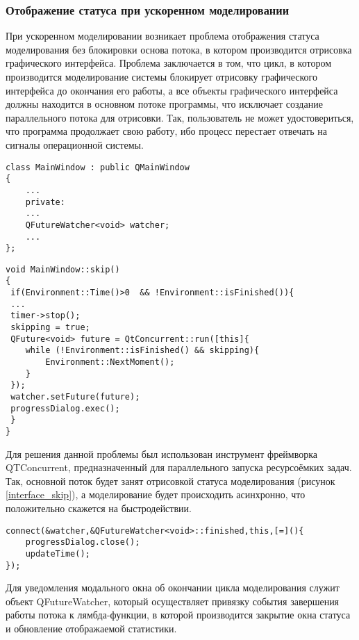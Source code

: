 \subsubsection{Отображение статуса при ускоренном моделировании}
При ускоренном моделировании возникает проблема отображения статуса моделирования без блокировки основа потока, в котором производится отрисовка графического интерфейса. Проблема заключается в том, что цикл, в котором производится моделирование системы блокирует отрисовку графического интерфейса до окончания его работы, а все объекты графического интерфейса должны находится в основном потоке программы, что исключает создание параллельного потока для отрисовки. Так, пользователь не может удостовериться, что программа продолжает свою работу, ибо процесс перестает отвечать на сигналы операционной системы.
\begin{lstlisting}
class MainWindow : public QMainWindow
{
	...
	private:
	...
	QFutureWatcher<void> watcher;
	...
};
\end{lstlisting}
\begin{lstlisting}
void MainWindow::skip()
{
 if(Environment::Time()>0  && !Environment::isFinished()){
 ...
 timer->stop();
 skipping = true;
 QFuture<void> future = QtConcurrent::run([this]{
	while (!Environment::isFinished() && skipping){
		Environment::NextMoment();
	}
 });
 watcher.setFuture(future);
 progressDialog.exec();
 }
}
\end{lstlisting}

Для решения данной проблемы был использован инструмент фреймворка QTConcurrent, предназначенный для параллельного запуска ресурсоёмких задач. Так, основной поток будет занят отрисовкой статуса моделирования (рисунок \ref{interface_skip}), а моделирование будет происходить асинхронно, что положительно скажется на быстродействии.
\begin{lstlisting}
connect(&watcher,&QFutureWatcher<void>::finished,this,[=](){
	progressDialog.close();
	updateTime();
});
\end{lstlisting}
Для уведомления модального окна об окончании цикла моделирования служит объект QFutureWatcher, который осуществляет привязку события завершения работы потока к лямбда-функции, в которой производится закрытие окна статуса и обновление отображаемой статистики.
\clearpage